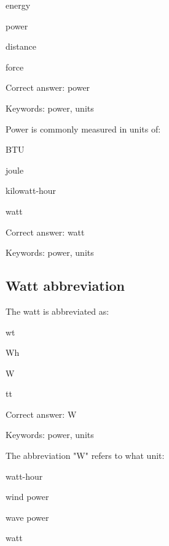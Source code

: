 \begin{answer}
	\item energy
	\item power
	\item distance
	\item force
\end{answer}

Correct answer: power

Keywords: power, units

\begin{question}
	\item Power is commonly measured in units of:
\end{question}

\begin{answer}
	\item BTU
	\item joule
	\item kilowatt-hour
	\item watt
\end{answer}

Correct answer: watt

Keywords: power, units

\subsection{Watt abbreviation}

\begin{question}
	\item The watt is abbreviated as:
\end{question}

\begin{answer}
	\item wt
	\item Wh
	\item W
	\item tt
\end{answer}

Correct answer: W

Keywords: power, units

\begin{question}
	\item The abbreviation "W" refers to what unit:
\end{question}

\begin{answer}
	\item watt-hour
	\item wind power
	\item wave power
	\item watt
\end{answer}

